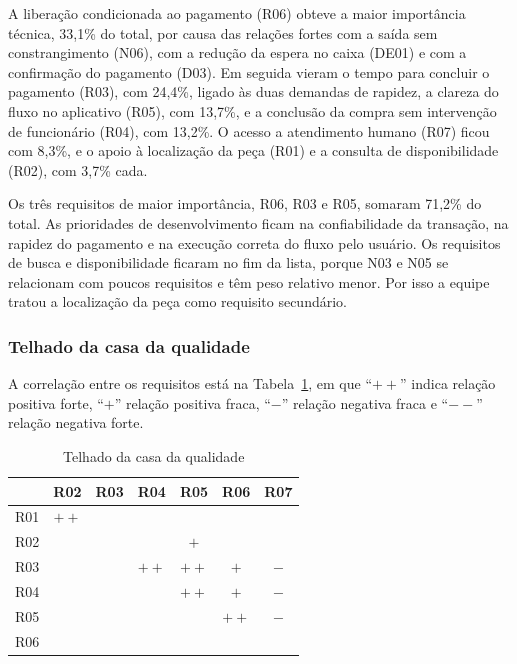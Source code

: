 A liberação condicionada ao pagamento (R06) obteve a maior importância técnica, 33,1\% do total, por causa das relações fortes com a saída sem constrangimento (N06), com a redução da espera no caixa (DE01) e com a confirmação do pagamento (D03). Em seguida vieram o tempo para concluir o pagamento (R03), com 24,4\%, ligado às duas demandas de rapidez, a clareza do fluxo no aplicativo (R05), com 13,7\%, e a conclusão da compra sem intervenção de funcionário (R04), com 13,2\%. O acesso a atendimento humano (R07) ficou com 8,3\%, e o apoio à localização da peça (R01) e a consulta de disponibilidade (R02), com 3,7\% cada.

Os três requisitos de maior importância, R06, R03 e R05, somaram 71,2\% do total. As prioridades de desenvolvimento ficam na confiabilidade da transação, na rapidez do pagamento e na execução correta do fluxo pelo usuário. Os requisitos de busca e disponibilidade ficaram no fim da lista, porque N03 e N05 se relacionam com poucos requisitos e têm peso relativo menor. Por isso a equipe tratou a localização da peça como requisito secundário.

\subsubsection{Telhado da casa da qualidade}

A correlação entre os requisitos está na Tabela~\ref{tab:teto_qfd}, em que ``$++$'' indica relação positiva forte, ``$+$'' relação positiva fraca, ``$-$'' relação negativa fraca e ``$--$'' relação negativa forte.

\begin{table}[htbp]
    \centering
    \caption{Telhado da casa da qualidade}
    \label{tab:teto_qfd}
    \footnotesize
    \renewcommand{\arraystretch}{1.25}
    \begin{tabular}{@{}l*{6}{c}@{}}
        \toprule
            & R02 & R03 & R04 & R05 & R06 & R07 \\
        \midrule
        R01 & $++$ &  &  &  &  &  \\
        R02 &   &  &  & $+$ &  &  \\
        R03 &   &   & $++$ & $++$ & $+$ & $-$ \\
        R04 &   &   &   & $++$ & $+$ & $-$ \\
        R05 &   &   &   &   & $++$ & $-$ \\
        R06 &   &   &   &   &   &  \\
        \bottomrule
    \end{tabular}
\end{table}

